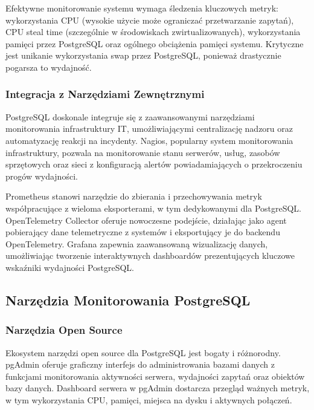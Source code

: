 \documentclass[letterpaper,10pt,polish]{sphinxmanual}
\begin{document}
\sphinxAtStartPar
Efektywne monitorowanie systemu wymaga śledzenia kluczowych metryk: wykorzystania CPU (wysokie użycie może ograniczać przetwarzanie zapytań), CPU steal time (szczególnie w środowiskach zwirtualizowanych), wykorzystania pamięci przez PostgreSQL oraz ogólnego obciążenia pamięci systemu. Krytyczne jest unikanie wykorzystania swap przez PostgreSQL, ponieważ drastycznie pogarsza to wydajność.


\subsubsection{Integracja z Narzędziami Zewnętrznymi}
\label{\detokenize{rozdzial2/repo-wspolne/index:integracja-z-narzedziami-zewnetrznymi}}
\sphinxAtStartPar
PostgreSQL doskonale integruje się z zaawansowanymi narzędziami monitorowania infrastruktury IT, umożliwiającymi centralizację nadzoru oraz automatyzację reakcji na incydenty. Nagios, popularny system monitorowania infrastruktury, pozwala na monitorowanie stanu serwerów, usług, zasobów sprzętowych oraz sieci z konfiguracją alertów powiadamiających o przekroczeniu progów wydajności.

\sphinxAtStartPar
Prometheus stanowi narzędzie do zbierania i przechowywania metryk współpracujące z wieloma eksporterami, w tym dedykowanymi dla PostgreSQL. OpenTelemetry Collector oferuje nowoczesne podejście, działając jako agent pobierający dane telemetryczne z systemów i eksportujący je do backendu OpenTelemetry. Grafana zapewnia zaawansowaną wizualizację danych, umożliwiając tworzenie interaktywnych dashboardów prezentujących kluczowe wskaźniki wydajności PostgreSQL.


\subsection{Narzędzia Monitorowania PostgreSQL}
\label{\detokenize{rozdzial2/repo-wspolne/index:narzedzia-monitorowania-postgresql}}

\subsubsection{Narzędzia Open Source}
\label{\detokenize{rozdzial2/repo-wspolne/index:narzedzia-open-source}}
\sphinxAtStartPar
Ekosystem narzędzi open source dla PostgreSQL jest bogaty i różnorodny. pgAdmin oferuje graficzny interfejs do administrowania bazami danych z funkcjami monitorowania aktywności serwera, wydajności zapytań oraz obiektów bazy danych. Dashboard serwera w pgAdmin dostarcza przegląd ważnych metryk, w tym wykorzystania CPU, pamięci, miejsca na dysku i aktywnych połączeń.
\end{document}
